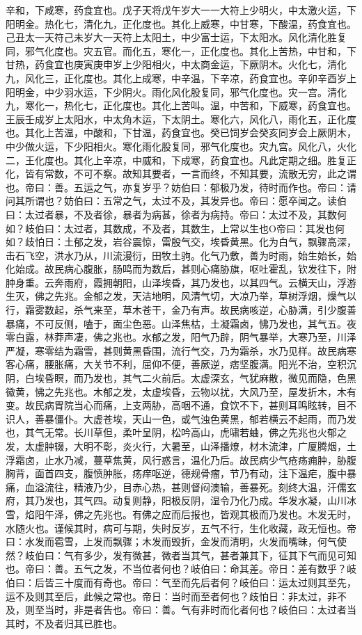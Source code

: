 \documentclass[a4paper,12pt,UTF8,twoside]{ctexbook}
\begin{document}
辛和，下咸寒，药食宜也。戊子天将戊午岁大一一大符上少明火，中太激火运，下阳明金。热化七，清化九，正化度也。其化上威寒，中甘寒，下酸温，药食宜也。己丑太一天符己未岁大一天符上太阳土，中少富士运，下太阳水。风化清化胜复同，邪气化度也。灾五官。而化五，寒化一，正化度也。其化上苦热，中甘和，下甘热，药食宜也庚寅庚申岁上少阳相火，中太商金运，下厥阴木。火化七，清化九，风化三，正化度也。其化上成寒，中辛温，下辛凉，药食宜也。辛卯辛酉岁上阳明金，中少羽水运，下少阴火。雨化风化股复同，邪气化度也。灾一宫。清化九，寒化一，热化七，正化度也。其化上苦叫。温，中苦和，下威寒，药食宜也。王辰壬成岁上太阳水，中太角木运，下太阴土。寒化六，风化八，雨化五，正化度也。其化上苦温，中酸和，下甘温，药食宜也。癸已饲岁会癸亥同岁会上厥阴木，中少做火运，下少阳相火。寒化雨化股复同，邪气化度也。灾九宫。风化八，火化二，王化度也。其化上辛凉，中威和，下成寒，药食宜也。凡此定期之细。胜复正化，皆有常数，不可不察。故知其要者，一言而终，不知其要，流散无穷，此之谓也。帝曰：善。五运之气，亦复岁乎？妨伯曰：郁极乃发，待时而作也。帝曰：请问其所谓也？妨伯曰：五常之气，太过不及，其发异也。帝曰：愿卒闻之。读伯曰：太过者暴，不及者徐，暴者为病甚，徐者为病持。帝曰：太过不及，其数何如？岐伯曰：太过者，其数成，不及者，其数生，上常以生也O帝曰：其发也何如？歧怕日：土郁之发，岩谷震惊，雷殷气交，埃昏黄黑。化为白气，飘骤高深，击石飞空，洪水乃从，川流漫衍，田牧土驹。化气乃敷，善为时雨，始生始长，始化始成。故民病心腹胀，肠鸣而为数后，甚则心痛胁旗，呕吐霍乱，钦发往下，附肿身重。云奔雨府，霞拥朝阳，山泽埃昏，其乃发也，以其四气。云横天山，浮游生灭，佛之先兆。金郁之发，天洁地明，风清气切，大凉乃举，草树浮烟，燥气以行，霜雾数起，杀气来至，草木苍干，金乃有声。故民病咳逆，心胁满，引少腹善暴痛，不可反侧，嗑于，面尘色恶。山泽焦枯，土凝霜卤，怫乃发也，其气五。夜零白露，林莽声凄，佛之兆也。水郁之发，阳气乃辟，阴气暴举，大寒乃至，川泽严凝，寒零结为霜雪，甚则黄黑昏围，流行气交，乃为霜杀，水乃见样。故民病寒客心痛，腰胀痛，大关节不利，屈仰不便，善厥逆，痞坚腹满。阳光不治，空积沉阴，白埃昏瞑，而乃发也，其气二火前后。太虚深玄，气犹麻散，微见而隐，色黑徽黄，怫之先兆也。木郁之发，太虚埃昏，云物以扰，大风乃至，屋发折木，木有变。故民病胃院当心而痛，上支两胁，高咽不通，食饮不下，甚则耳鸣眩转，目不识人，善暴僵仆。大虚苍埃，天山一色，或气浊色黄黑，郁若横云不起雨，而乃发也，其气无常。长川草但，柔叶呈阴，松吟高山，虎啸若蛐，佛之先兆也火郁之发，太虚肿辍，大明不彰，炎火行，大暑至，山泽播燎，材木流津，广厦腾烟，土浮霜卤，止水乃减，蔓草焦黄，风行惑言，温化乃后。故民病少气疮疡痈肿，胁腹胸背，面首四支，腹愤肿胀，疡痒呕逆，德规骨瘤，节乃有动，注下温疟，腹中暴痛，血溢流往，精液乃少，目赤心热，甚则督闷澳输，善暴死。刻终大温，汗儒玄府，其乃发也，其气四。动复则静，阳极反阴，湿令乃化乃成。华发水凝，山川冰雪，焰阳午泽，佛之先兆也。有佛之应而后报也，皆观其极而乃发也。木发无时，水随火也。谨候其时，病可与期，失时反岁，五气不行，生化收藏，政无恒也。帝曰：水发而雹雪，上发而飘骤；木发而毁折，金发而清明，火发而嘴昧，何气使然？岐伯曰：气有多少，发有微甚，微者当其气，甚者兼其下，征其下气而见可知也。帝曰：善。五气之发，不当位者何也？岐伯曰：命其差。帝日：差有数乎？岐伯曰：后皆三十度而有奇也。帝曰：气至而先后者何？岐伯曰：运太过则其至先，运不及则其至后，此候之常也。帝日：当时而至者何也？歧怕日：非太过，非不及，则至当时，非是者告也。帝曰：善。气有非时而化者何也？岐伯曰：太过者当其时，不及者归其已胜也。
\end{document}
